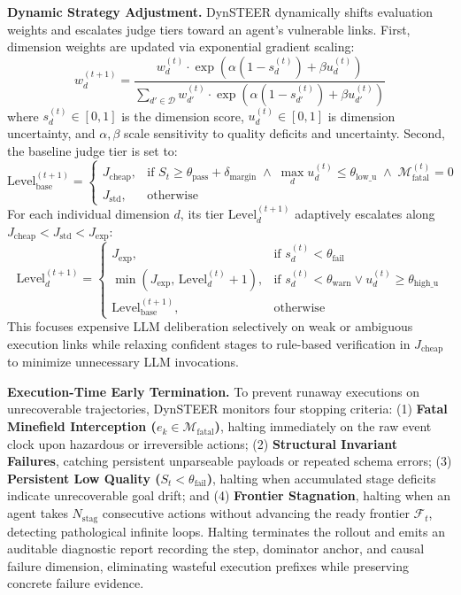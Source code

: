 \textbf{Dynamic Strategy Adjustment.} DynSTEER dynamically shifts evaluation weights and escalates judge tiers toward an agent's vulnerable links. First, dimension weights are updated via exponential gradient scaling:
\begin{equation}
    w_d^{(t+1)} = \frac{w_d^{(t)} \cdot \exp\left( \alpha (1 - s_d^{(t)}) + \beta u_d^{(t)} \right)}{\sum_{d' \in \mathcal{D}} w_{d'}^{(t)} \cdot \exp\left( \alpha (1 - s_{d'}^{(t)}) + \beta u_{d'}^{(t)} \right)}
    \label{eq:weight_update}
\end{equation}
where $s_d^{(t)} \in [0, 1]$ is the dimension score, $u_d^{(t)} \in [0, 1]$ is dimension uncertainty, and $\alpha, \beta$ scale sensitivity to quality deficits and uncertainty. Second, the baseline judge tier is set to:
\begin{equation}
    \text{Level}_{\text{base}}^{(t+1)} = 
    \begin{cases}
    J_{\text{cheap}}, & \text{if } S_t \ge \theta_{\text{pass}} + \delta_{\text{margin}} \;\land\; \max_{d} u_d^{(t)} \le \theta_{\text{low\_u}} \;\land\; \mathcal{M}_{\text{fatal}}^{(t)} = 0 \\
    J_{\text{std}}, & \text{otherwise}
    \end{cases}
    \label{eq:level_base}
\end{equation}
For each individual dimension $d$, its tier $\text{Level}_d^{(t+1)}$ adaptively escalates along $J_{\text{cheap}} < J_{\text{std}} < J_{\text{exp}}$:
\begin{equation}
    \text{Level}_d^{(t+1)} = 
    \begin{cases}
    J_{\text{exp}}, & \text{if } s_d^{(t)} < \theta_{\text{fail}} \\
    \min\left(J_{\text{exp}},\, \text{Level}_d^{(t)} + 1\right), & \text{if } s_d^{(t)} < \theta_{\text{warn}} \lor u_d^{(t)} \ge \theta_{\text{high\_u}} \\
    \text{Level}_{\text{base}}^{(t+1)}, & \text{otherwise}
    \end{cases}
    \label{eq:level_dim}
\end{equation}
This focuses expensive LLM deliberation selectively on weak or ambiguous execution links while relaxing confident stages to rule-based verification in $J_{\text{cheap}}$ to minimize unnecessary LLM invocations.

\textbf{Execution-Time Early Termination.} To prevent runaway executions on unrecoverable trajectories, DynSTEER monitors four stopping criteria: (1) \textbf{Fatal Minefield Interception ($e_k \in \mathcal{M}_{\text{fatal}}$)}, halting immediately on the raw event clock upon hazardous or irreversible actions; (2) \textbf{Structural Invariant Failures}, catching persistent unparseable payloads or repeated schema errors; (3) \textbf{Persistent Low Quality ($S_t < \theta_{\text{fail}}$)}, halting when accumulated stage deficits indicate unrecoverable goal drift; and (4) \textbf{Frontier Stagnation}, halting when an agent takes $N_{\text{stag}}$ consecutive actions without advancing the ready frontier $\mathcal{F}_t$, detecting pathological infinite loops. Halting terminates the rollout and emits an auditable diagnostic report recording the step, dominator anchor, and causal failure dimension, eliminating wasteful execution prefixes while preserving concrete failure evidence.
